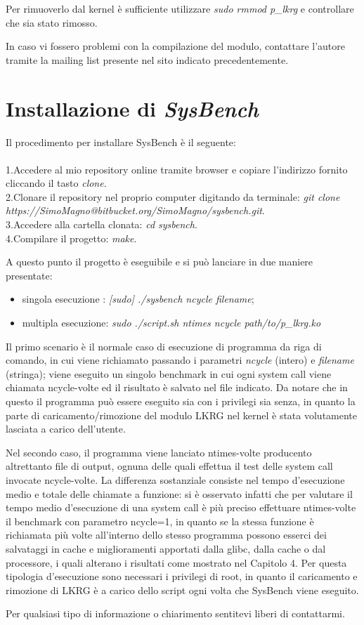 Per rimuoverlo dal kernel è sufficiente utilizzare \emph{sudo rmmod p\_lkrg} e controllare che sia stato rimosso.

In caso vi fossero problemi con la compilazione del modulo, contattare l'autore tramite la mailing list presente nel sito indicato precedentemente.

\section{Installazione di \emph{SysBench}}

Il procedimento per installare SysBench è il seguente:\\\\
1.Accedere al mio repository online tramite browser e copiare l'indirizzo fornito cliccando il tasto \emph{clone}.\\
2.Clonare il repository nel proprio computer digitando da terminale: \emph{git clone https://SimoMagno@bitbucket.org/SimoMagno/sysbench.git}.\\
3.Accedere alla cartella clonata: \emph{cd sysbench}.\\
4.Compilare il progetto: \emph{make}.

A questo punto il progetto è eseguibile e si può lanciare in due maniere presentate:

\begin{itemize}
\item singola esecuzione : \emph{[sudo] ./sysbench ncycle filename};
\item multipla esecuzione: \emph{sudo ./script.sh ntimes ncycle path/to/p\_lkrg.ko}
\end{itemize}

Il primo scenario è il normale caso di esecuzione di programma da riga di comando, in cui viene richiamato passando i parametri \emph{ncycle} (intero) e \emph{filename} (stringa); viene eseguito un singolo benchmark in cui ogni system call viene chiamata ncycle-volte ed il risultato è salvato nel file indicato. Da notare che in questo il programma può essere eseguito sia con i privilegi sia senza, in quanto la parte di caricamento/rimozione del modulo LKRG nel kernel è stata volutamente lasciata a carico dell'utente.

Nel secondo caso, il programma viene lanciato ntimes-volte producento altrettanto file di output, ognuna delle quali effettua il test delle system call invocate ncycle-volte. La differenza sostanziale consiste nel tempo d'esecuzione medio e totale delle chiamate a funzione: si è osservato infatti che per valutare il tempo medio d'esecuzione di una system call è più preciso effettuare ntimes-volte il benchmark con parametro ncycle=1, in quanto se la stessa funzione è richiamata più volte all'interno dello stesso programma possono esserci dei salvataggi in cache e miglioramenti apportati dalla glibc, dalla cache o dal processore, i quali alterano i risultati come mostrato nel Capitolo 4. Per questa tipologia d'esecuzione sono necessari i privilegi di root, in quanto il caricamento e rimozione di LKRG è a carico dello script ogni volta che SysBench viene eseguito.

Per qualsiasi tipo di informazione o chiarimento sentitevi liberi di contattarmi.
